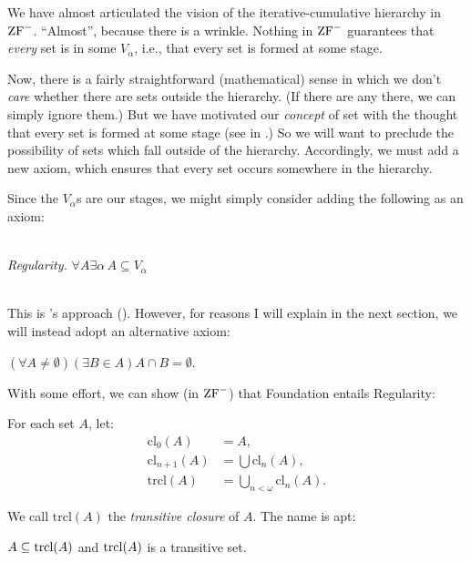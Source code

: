\documentclass[../../../include/open-logic-section]{subfiles}
\begin{document}


We have almost articulated the vision of the iterative-cumulative
hierarchy in~$\mathrm{ZF}^{-}$. ``Almost'', because there is a wrinkle. Nothing in
$\mathrm{ZF}^{-}$ guarantees that \emph{every} set is in some $V_\alpha$,
i.e., that every set is formed at some stage. 

Now, there is a fairly straightforward (mathematical) sense in which
we don't \emph{care} whether there are sets outside the hierarchy. (If
there are any there, we can simply ignore them.) But we have motivated
our \emph{concept} of set with the thought that every set is formed at
some stage (see \stageshier{} in .) So
we will want to preclude the possibility of sets which fall outside of
the hierarchy. Accordingly, we must add a new axiom, which ensures
that every set occurs somewhere in the hierarchy. 

Since the $V_\alpha$s are our stages, we might simply consider adding
the following as an axiom:

\
\\\emph{Regularity.} $\forall A \exists \alpha\, A \subseteq V_\alpha$

\ \\This is \citeauthor{VonNeumann1925}'s approach
(\citeyear{VonNeumann1925}). However, for reasons I will explain in
the next section, we will instead adopt an alternative axiom:

\begin{axiom}[Foundation]
$(\forall A \neq \emptyset)(\exists B \in A)A \cap B = \emptyset$.
\end{axiom}

With some effort, we can show (in $\mathrm{ZF}^{-}$) that Foundation entails Regularity:
\begin{defn}
For each set $A$, let:
\begin{align*}
	\text{cl}_0(A) &= A,\\
	\text{cl}_{n+1}(A) &= \bigcup \text{cl}_n(A),\\
	\text{trcl}(A) &= \bigcup_{n < \omega} \text{cl}_{n}(A).
\end{align*}
\end{defn}

We call $\text{trcl}(A)$ the \emph{transitive closure} of $A$. The name is apt:

\begin{prop}
$A \subseteq \mathrm{trcl}(A)$ and $\mathrm{trcl}(A)$ is a transitive set. 
\end{prop}
\end{document}
